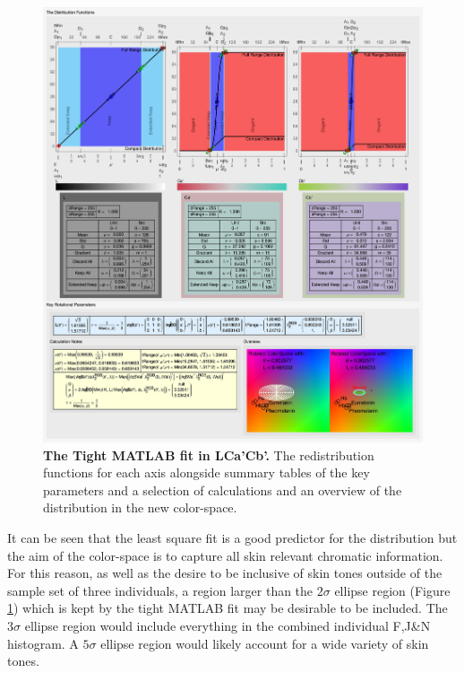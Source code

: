 \begin{figure}[h!]
  \centering
  \includegraphics[width=1.0 \textwidth]{Chapter3/Figs/Distribution_Results_Final.jpg} 
    \caption{ \textbf{The Tight MATLAB fit in LCa'Cb'.} The redistribution functions for each axis alongside summary tables of the key parameters and a selection of calculations and an overview of the distribution in the new color-space.}  \label{fig:DistributionResultsFinal}
\end{figure}

It can be seen that the least square fit is a good predictor for the distribution but the aim of the color-space is to capture all skin relevant chromatic information. For this reason,  as well as the desire to be inclusive of skin tones outside of the sample set of three individuals, a region larger than the $2\sigma$ ellipse region (Figure \ref{fig:DistributionResultsFinal}) which is kept by the tight MATLAB fit may be desirable to be included. The $3\sigma$ ellipse region would include everything in the combined individual F,J\&N histogram. A $5\sigma$ ellipse region would  likely account for a wide variety of skin tones. 

